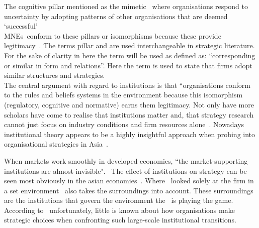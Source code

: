  The cognitive pillar mentioned as the mimetic \iso~where organisations respond to uncertainty by adopting patterns of other organisations that are deemed `successful'~\cite{Westney:2005,Peng:2008,Kostova:1999,DiMaggio:1983,Scott:1995}\\ 
\glspl{MNE}~conform to these pillars or isomorphisms because these provide legitimacy~\cite{Powell:1991}.
The terms pillar and \iso are used interchangeable in strategic literature. 
For the sake of clarity in here the term \iso will be used as defined as: ``corresponding or similar in form and relations''. Here the term is used to state that firms adopt similar structures and strategies.\\

The central argument with regard to institutions is that “organisations conform to the rules and beliefs systems in the environment because this isomorphism (regulatory, cognitive and normative) earns them legitimacy.
Not only have more scholars have come to realise that institutions matter and, that strategy research cannot just focus on industry conditions and firm resources alone~\cite{Powell:1991,Scott:1995}.
Nowadays institutional theory appears to be a highly insightful approach when probing into organisational strategies in Asia~\cite{Hoskisson:2000}.


When markets work smoothly in developed economies, ``the market-supporting institutions are almost invisible".~\cite{McMillan:2008}
The effect of institutions on strategy can be seen most obviously in the asian economies~\cite{Peng:2002}.
Where \rbv~looked solely at the firm in a set environment \ibv~also takes the surroundings into account. These surroundings are the institutions that govern the environment the \mne~is playing the game. \\

According to~\cite{Peng:2003} unfortunately, little is known about how organisations make strategic choices when confronting such large-scale institutional transitions.